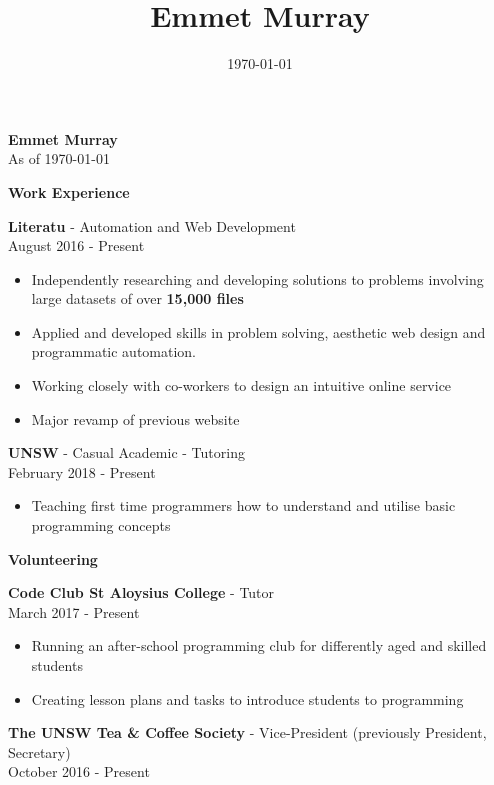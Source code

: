 \documentclass{article}
\title{\textbf{Emmet Murray}}
\date{\today}
\newcommand{\minititle}[1]{\begin{center}\textbf{#1} \end{center} \vspace{0.2cm}}
\newcommand{\resumeEntry}[3]{{\large \textbf{#1} - #2} \\ \small{#3}}
\begin{document}
 
%
\begin{minipage}[t]{0.6\linewidth}   
    \begin{center}
        { \huge \textbf{Emmet Murray}} \\
        \vspace{0.4cm}
        As of \today
    \end{center}
    {
        \minititle{Work Experience}
        \resumeEntry{Literatu}{Automation and Web Development}{August 2016 - Present}
        \begin{itemize}
            \setlength\itemsep{0.05cm}
            \item Independently researching and developing solutions to problems involving large datasets of over \textbf{15,000 files}
            \item Applied and developed skills in problem solving, aesthetic web design and programmatic automation.
            \item Working closely with co-workers to design an intuitive online service
            \item Major revamp of previous website
        \end{itemize}
        \vspace{0.3cm}
        \resumeEntry{UNSW}{Casual Academic - Tutoring}{February 2018 - Present}
        \begin{itemize}
            \setlength\itemsep{0.05cm}
            \item Teaching first time programmers how to understand and utilise basic programming concepts
        \end{itemize}
    }
    {
        \vspace{0.05cm}
        \minititle{Volunteering}
        \resumeEntry{Code Club St Aloysius College}{Tutor}{March 2017 - Present}
        \begin{itemize}
            \setlength\itemsep{0.05cm}
            \item Running an after-school programming club for differently aged and skilled students
            \item Creating lesson plans and tasks to introduce students to programming
        \end{itemize}
        \vspace{0.4cm}
        \resumeEntry{The UNSW Tea \& Coffee Society}{Vice-President (previously President, Secretary)}{October 2016 - Present}
        \begin{itemize}

\end{itemize}}
\end{minipage}
\end{document}
